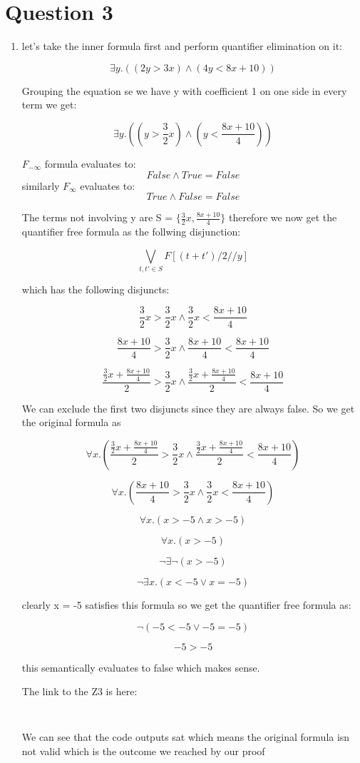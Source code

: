 \documentclass{article}
\begin{document}
\section{Question 3}

\begin{enumerate}
    \item let's take the inner formula first and perform quantifier elimination on it:
    
    $$\exists y. ((2y > 3x) \land (4y < 8x + 10))$$

    Grouping the equation se we have y with coefficient 1 on one side in every term we get:

    $$\exists y. ((y > \frac{3}{2}x) \land (y < \frac{8x + 10}{4}))$$

    
    $F_{- \infty}$ formula evaluates to:
    $$False \land True = False$$
    similarly $F_{\infty }$ evaluates to:
    $$True \land False = False$$
    
    The terms not involving y are S = $\{\frac{3}{2}x, \frac{8x+10}{4} \}$
    therefore we now get the quantifier free formula as the follwing disjunction:

    $$\bigvee_{t,t' \in S} F[(t+t')/2//y]$$

    which has the following disjuncts:

    $$\frac{3}{2}x > \frac{3}{2}x \land \frac{3}{2}x < \frac{8x+10}{4}$$

    $$\frac{8x+10}{4} > \frac{3}{2}x \land \frac{8x+10}{4} < \frac{8x+10}{4}$$

    $$\frac{\frac{3}{2}x + \frac{8x+10}{4}}{2} > \frac{3}{2}x \land \frac{\frac{3}{2}x + \frac{8x+10}{4}}{2} < \frac{8x+10}{4}$$

    We can exclude the first two disjuncts since they are always false. So we get the original formula as

    $$\forall x. (\frac{\frac{3}{2}x + \frac{8x+10}{4}}{2} > \frac{3}{2}x \land \frac{\frac{3}{2}x + \frac{8x+10}{4}}{2} < \frac{8x+10}{4})$$

    $$\forall x. (\frac{8x+10}{4} > \frac{3}{2}x \land \frac{3}{2}x < \frac{8x+10}{4})$$

    $$\forall x. (x > -5 \land x > -5)$$

    $$\forall x. (x > -5)$$

    $$\neg \exists \neg (x > -5)$$

    $$\neg \exists x. (x < -5 \lor x = -5)$$

    clearly x = -5 satisfies this formula so we get the quantifier free formula as:

    $$\neg (-5 < -5 \lor -5 = -5)$$

    $$-5 > -5$$

    this semantically evaluates to false which makes sense.

    The link to the Z3 is here: \begin{verbatim}
        
    \end{verbatim}

    We can see that the code outputs sat which means the original formula isn not valid which is the outcome we reached by our proof

\end{enumerate}
\end{document}
